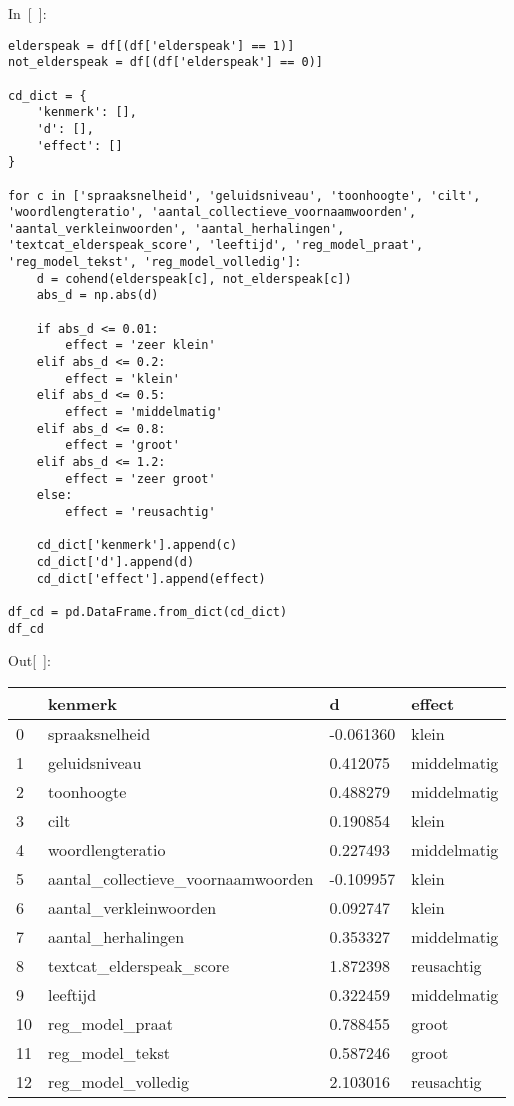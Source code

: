 \documentclass[
]{article}
\begin{document}
In~{[}~{]}:

\begin{verbatim}
elderspeak = df[(df['elderspeak'] == 1)]
not_elderspeak = df[(df['elderspeak'] == 0)]

cd_dict = {
    'kenmerk': [],
    'd': [],
    'effect': []
}

for c in ['spraaksnelheid', 'geluidsniveau', 'toonhoogte', 'cilt', 'woordlengteratio', 'aantal_collectieve_voornaamwoorden', 'aantal_verkleinwoorden', 'aantal_herhalingen', 'textcat_elderspeak_score', 'leeftijd', 'reg_model_praat', 'reg_model_tekst', 'reg_model_volledig']:
    d = cohend(elderspeak[c], not_elderspeak[c])
    abs_d = np.abs(d)
    
    if abs_d <= 0.01:
        effect = 'zeer klein'
    elif abs_d <= 0.2:
        effect = 'klein'
    elif abs_d <= 0.5:
        effect = 'middelmatig'
    elif abs_d <= 0.8:
        effect = 'groot'
    elif abs_d <= 1.2:
        effect = 'zeer groot'
    else:
        effect = 'reusachtig'

    cd_dict['kenmerk'].append(c) 
    cd_dict['d'].append(d) 
    cd_dict['effect'].append(effect) 

df_cd = pd.DataFrame.from_dict(cd_dict)
df_cd
\end{verbatim}

Out{[}~{]}:

\begin{longtable}[]{@{}llll@{}}
\toprule
& kenmerk & d & effect \\
\midrule
\endhead
0 & spraaksnelheid & -0.061360 & klein \\
1 & geluidsniveau & 0.412075 & middelmatig \\
2 & toonhoogte & 0.488279 & middelmatig \\
3 & cilt & 0.190854 & klein \\
4 & woordlengteratio & 0.227493 & middelmatig \\
5 & aantal\_collectieve\_voornaamwoorden & -0.109957 & klein \\
6 & aantal\_verkleinwoorden & 0.092747 & klein \\
7 & aantal\_herhalingen & 0.353327 & middelmatig \\
8 & textcat\_elderspeak\_score & 1.872398 & reusachtig \\
9 & leeftijd & 0.322459 & middelmatig \\
10 & reg\_model\_praat & 0.788455 & groot \\
11 & reg\_model\_tekst & 0.587246 & groot \\
12 & reg\_model\_volledig & 2.103016 & reusachtig \\
\bottomrule
\end{longtable}
\end{document}
